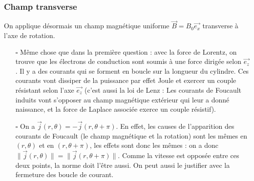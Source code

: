 \documentclass{report}
\begin{document}
\subsubsection*{Champ transverse}	
	
	On applique désormais un champ magnétique uniforme $\vec{B}=B_{0}\vec{e_{x}}$ transverse à l'axe de rotation.
	
\begin{itemize}
	
		\item[$\square$] Même chose que dans la première question : avec la force de Lorentz, on trouve que les électrons de conduction sont soumis à une force dirigée selon $\vec{e_z}$. Il y a des courants qui se forment en boucle sur la longueur du cylindre. Ces courants vont dissiper de la puissance par effet Joule et exercer un couple résistant selon l'axe $\vec{e_z}$ (c'est aussi la loi de Lenz : Les courants de Foucault induits vont s'opposer au champ magnétique extérieur qui leur a donné naissance, et la force de Laplace associée exerce un couple résistif).

		\item[$\square$] On a $\vec{j}(r,\theta)=-\vec{j}(r,\theta+\pi)$. En effet, les causes de l'apparition des courants de Foucault (le champ magnétique et la rotation) sont les mêmes en $(r,\theta)$ et en $(r,\theta+\pi)$, les effets sont donc les mêmes : on a donc $\parallel\vec{j}(r,\theta)\parallel=\parallel\vec{j}(r,\theta+\pi)\parallel$. Comme la vitesse est opposée entre ces deux points, la norme doit l'être aussi. On peut aussi le justifier avec la fermeture des boucle de courant.
		

\end{itemize}
\end{document}
